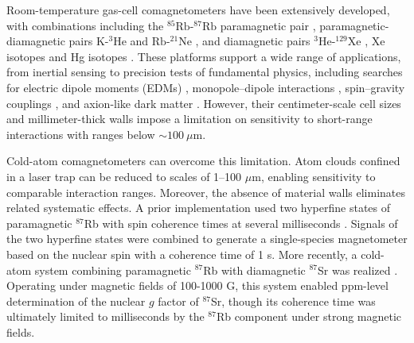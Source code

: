 \documentclass[pdflatex,sn-nature,centre]{sn-jnl}%
\begin{document}
Room-temperature gas-cell comagnetometers have been extensively developed, with combinations including the $^{85}\mathrm{Rb}$-$^{87}\mathrm{Rb}$ paramagnetic pair \cite{Kimball2013ComagSpinGravity}, paramagnetic-diamagnetic pairs $\mathrm K$-$^3\mathrm{He}$ \cite{Vasilakis2009ComagSpinDependent} and $\mathrm {Rb}$-$^{21}\mathrm{Ne}$ \cite{Almasi2020ComagSpinSpin}, and diamagnetic pairs $^3\mathrm{He}$-$^{129}\mathrm{Xe}$ \cite{Cane2004ComagLorentz&CPT, Allmendinger2014ComagLorentz&CPT, Almasi2020ComagSpinSpin}, 
Xe isotopes \cite{Bulatowicz2013ComagAxionlike, Feng2022XeComagM-N} and Hg isotopes \cite{Lamoreaux1986ComagLorentz}. These platforms support a wide range of applications, from inertial sensing \cite{Kornack2005ComagGyroscope} to precision tests of fundamental physics, including searches for electric dipole moments (EDMs) \cite{Rosenberry2001ComagEDM, Sachdeva2019ComagEDM, Abel2020ComagnEDM}, monopole–dipole interactions \cite{Bulatowicz2013ComagAxionlike, Tullney2013SpinDependent, Feng2022XeComagM-N}, spin–gravity couplings \cite{Venema1992HgComagSpinGravity, Vasilakis2009ComagSpinDependent, Kimball2013ComagSpinGravity, Zhang2023ComagSpinGravity}, and axion-like dark matter \cite{Wu2019ComagDarkMatter, Alonso2019ComagDarkMatter}. However, their centimeter-scale cell sizes and millimeter-thick walls impose a limitation on sensitivity to short-range interactions with ranges below $\sim100\ \mu$m.

Cold-atom comagnetometers can overcome this limitation. Atom clouds confined in a laser trap can be reduced to scales of 1–100 $\mu$m, enabling sensitivity to comparable interaction ranges. Moreover, the absence of material walls eliminates related systematic effects. A prior implementation used two hyperfine states of paramagnetic $^{87}$Rb  with spin coherence times at several milliseconds \cite{Pau2020BECComag}. Signals of the two hyperfine states were combined to generate a single-species magnetometer based on the nuclear spin with a coherence time of 1 s. More recently, a cold-atom system combining paramagnetic $^{87}$Rb with diamagnetic $^{87}$Sr was realized \cite{Thekkeppatt2025ComaggFactor}. Operating under magnetic fields of 100-1000 G, this system enabled ppm-level determination of the nuclear $\mathit g$ factor of $^{87}$Sr, though its coherence time was ultimately limited to milliseconds by the $^{87}$Rb component under strong magnetic fields.
\end{document}
